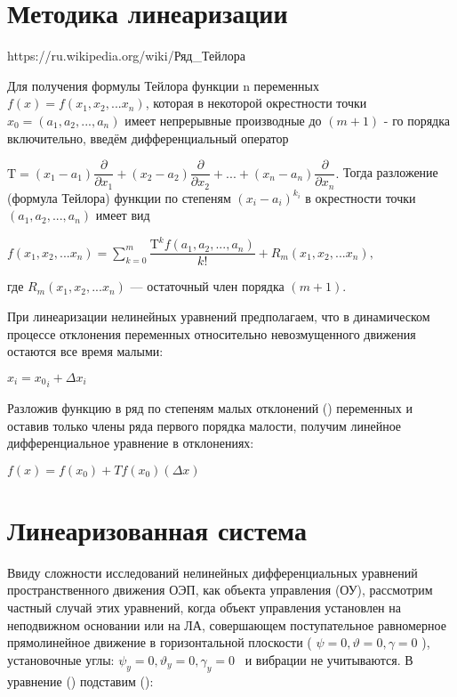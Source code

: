 \section{Методика линеаризации} \label{ch:ch3/linerization}

https://ru.wikipedia.org/wiki/Ряд_Тейлора


Для получения формулы Тейлора функции n переменных $f(x) = f(x_1, x_2, ... x_n)$, которая в некоторой окрестности точки  
$ x_0 = (a_{1},a_{2},...,a_{n})$ имеет непрерывные производные до  $(m+1)$ - го порядка включительно, введём дифференциальный оператор

$ \mathrm {T} =(x_{1}-a_{1}){\dfrac {\partial }{\partial x_{1}}}+(x_{2}-a_{2}){\dfrac {\partial }{\partial x_{2}}}+...+(x_{n}-a_{n}){\dfrac {\partial }{\partial x_{n}}}.$ 
Тогда разложение (формула Тейлора) функции по степеням  $ (x_{i}-a_{i})^{k_{i}}$ в окрестности точки   $(a_{1},a_{2},...,a_{n})$ имеет вид

 $ f(x_{1},x_{2},...x_{n})=\sum \limits _{k=0}^{m}{\dfrac {\mathrm {T} ^{k}f(a_{1},a_{2},...,a_{n})}{k!}}+R_{m}(x_{1},x_{2},...x_{n}),$
 
где $ R_m(x_1, x_2, ... x_n)$ — остаточный член порядка $(m+1)$.

При линеаризации нелинейных уравнений предполагаем, что в динамическом процессе отклонения переменных относительно невозмущенного движения остаются все время малыми:

$x_i = {x_0}_i + \Delta x_i$

Разложив функцию в ряд по степеням малых отклонений () переменных и оставив только члены ряда первого порядка малости, получим линейное дифференциальное уравнение в отклонениях:

$ f(x) = f(x_0) + T f(x_0) (\Delta x)$

\section{Линеаризованная система} \label{ch:ch3/sect10}

Ввиду сложности исследований нелинейных дифференциальных уравнений пространственного движения ОЭП, как объекта управления (ОУ), рассмотрим частный случай этих уравнений, когда объект управления установлен на неподвижном основании или на ЛА, совершающем поступательное равномерное прямолинейное движение в горизонтальной плоскости ( \( \psi =0, \vartheta =0, \gamma =0 \) ), установочные углы: \( \psi _{y}=0, \vartheta _{y}=0, \gamma _{y}=0 \) \ и вибрации не учитываются. В уравнение () подставим ():

